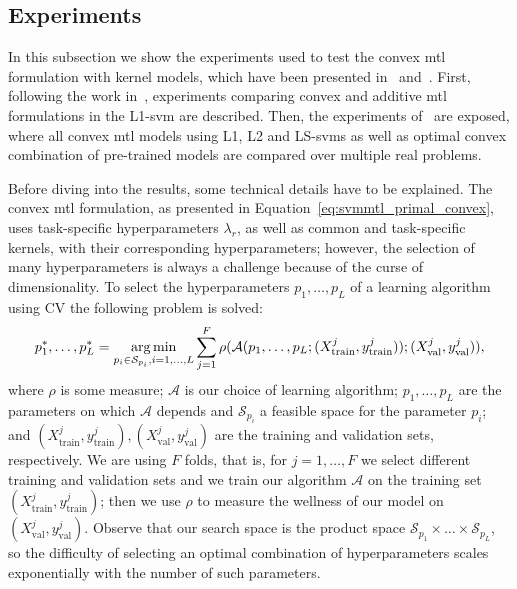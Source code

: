\subsection{Experiments}\label{subsec:convexmtlsvm_exp}
In this subsection we show the experiments used to test the convex \acrshort{mtl} formulation with kernel models, which have been presented in~\citep{RuizAD19} and~\citep{RuizAD21}. 
%
First, following the work in~\citep{RuizAD19}, experiments comparing convex and additive \acrshort{mtl} formulations in the L1-\acrshort{svm} are described. 
%
Then, the experiments of~\citep{RuizAD21} are exposed, where all convex \acrshort{mtl} models using L1, L2 and LS-\acrshort{svm}s as well as optimal convex combination of pre-trained models are compared over multiple real problems.

Before diving into the results, some technical details have to be explained. The convex \acrshort{mtl} formulation, as presented in Equation~\eqref{eq:svmmtl_primal_convex}, uses task-specific hyperparameters $\lambda_r$, as well as common and task-specific kernels, with their corresponding hyperparameters; however, the selection of many hyperparameters is always a challenge because of the curse of dimensionality. 
%
To select the hyperparameters $p_1, \ldots, p_L$ of a learning algorithm using CV the following problem is solved:
\begin{equation}
    \label{eq:hp-selection_general}
    p_1^*, \ldots, p_L^* = \argmin_{p_i \in \mathcal{S}_{p_i}, i=1, \ldots, L} \sum_{j=1}^{F} \rho(\mathcal{A}(p_1, \ldots, p_L; (X^j_\text{train}, y^j_\text{train})); (X^j_\text{val}, y^j_\text{val})) ,
\end{equation}
where $\rho$ is some measure; $\mathcal{A}$ is our choice of learning algorithm; $p_1, \ldots, p_L$ are the parameters on which $\mathcal{A}$ depends and $\mathcal{S}_{p_i}$ a feasible space for the parameter $p_i$; and $(X^j_\text{train}, y^j_\text{train}), (X^j_\text{val}, y^j_\text{val})$ are the training and validation sets, respectively. We are using $F$ folds, that is, for $j=1, \ldots, F$ we select different training and validation sets and we train our algorithm $\mathcal{A}$ on the training set $(X^j_\text{train}, y^j_\text{train})$; then we use $\rho$ to measure the wellness of our model on $(X^j_\text{val}, y^j_\text{val})$. 
%
Observe that our search space is the product space $\mathcal{S}_{p_1} \times \ldots \times \mathcal{S}_{p_L}$, so the difficulty of selecting an optimal combination of hyperparameters scales exponentially with the number of such parameters.

